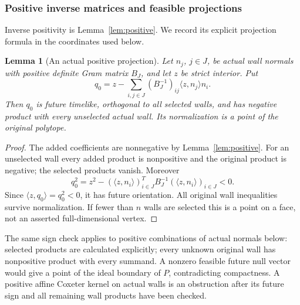 \documentclass[11pt]{article}
\newtheorem{lemma}[theorem]{Lemma}
\theoremstyle{remark}\newtheorem{remark}[theorem]{Remark}
\numberwithin{equation}{section}
\newcommand{\ip}[2]{\langle #1,#2\rangle}
\begin{document}
\subsubsection{Positive inverse matrices and feasible projections}
Inverse positivity is Lemma~\ref{lem:positive}. We record its explicit
projection formula in the coordinates used below.

\begin{lemma}[An actual positive projection]
\label{compact:lem:projection}
Let \(n_j\), \(j\in J\), be actual wall normals with positive
definite Gram matrix \(B_J\), and let \(z\) be strict interior.
Put
 \[
 q_0=z-\sum_{i,j\in J}(B_J^{-1})_{ij}\ip{z}{n_j}n_i.
\]
Then \(q_0\) is future timelike, orthogonal to all selected walls,
and has negative product with every unselected actual wall.
Its normalization is a point of the original polytope.
\end{lemma}
\begin{proof}
The added coefficients are nonnegative by Lemma~\ref{lem:positive}.
For an unselected wall every added product is nonpositive and the
original product is negative; the selected products vanish.
Moreover
 \[
 q_0^2=z^2-
   (\ip{z}{n_i})_{i\in J}^{T}B_J^{-1}
   (\ip{z}{n_i})_{i\in J}<0.
\]
Since \(\ip{z}{q_0}=q_0^2<0\), it has future orientation.
All original wall inequalities survive normalization.
If fewer than \(n\) walls are selected this is a point on a face,
not an asserted full-dimensional vertex.
\end{proof}
The same sign check applies to positive combinations of actual
normals below: selected products are calculated explicitly; every
unknown original wall has nonpositive product with every summand.
A nonzero feasible future null vector would give a point of the
ideal boundary of \(P\), contradicting compactness. A positive
affine Coxeter kernel on actual walls is an obstruction after its
future sign and all remaining wall products have been checked.
\end{document}
